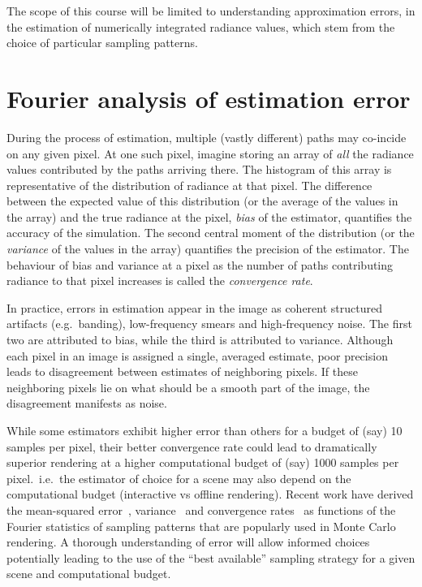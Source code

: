 \documentclass{acmsiggraph}
\begin{document}
The scope of this course will be limited to understanding approximation errors, in the estimation of numerically integrated radiance values, which stem from the choice of particular sampling patterns.

\section{Fourier analysis of estimation error}
During the process of estimation, multiple (vastly different) paths may co-incide on any given pixel. At one such pixel, imagine storing an array of \textit{all} the radiance values contributed by the paths arriving there. The histogram of this array is representative of the distribution of radiance at that pixel. The difference between the expected value of this distribution (or the average of the values in the array) and the true radiance at the pixel, \textit{bias} of the estimator, quantifies the accuracy of the simulation.  The second central moment of the distribution (or the \textit{variance} of the values in the array) quantifies the precision of the estimator. The behaviour of bias and variance at a pixel as the number of paths contributing radiance to that pixel increases is called the \textit{convergence rate}. 

In practice, errors in estimation appear in the image as coherent structured artifacts (e.g.~banding), low-frequency smears and high-frequency noise. The first two are attributed to bias, while the third is attributed to variance. Although each pixel in an image is assigned a single, averaged estimate, poor precision leads to disagreement between estimates of neighboring pixels. If these neighboring pixels lie on what should be a smooth part of the image, the disagreement manifests as noise. 

While some estimators exhibit higher error than others for a budget of (say) 10 samples per pixel, their better convergence rate could lead to dramatically superior rendering at a higher computational budget of (say) 1000 samples per pixel.~i.e.~the estimator of choice for a scene may also depend on the computational budget (interactive vs offline rendering). Recent work have derived the mean-squared error~\cite{durand2011frequency,Ramamoorthi:2012}, variance~\cite{Subr:2013:FAS,subr14error} and convergence rates~\cite{Pilleboue:2015:VAM} as functions of the Fourier statistics of sampling patterns that are popularly used in Monte Carlo rendering. A thorough understanding of error will allow informed choices potentially leading to the use of the ``best available'' sampling strategy for a given scene and computational budget. 
\end{document}
